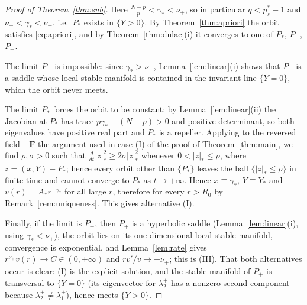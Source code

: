 \documentclass[11pt,reqno]{amsart}
\numberwithin{equation}{section}
\theoremstyle{plain}
\theoremstyle{definition}
\newcommand{\gs}{\gamma_{*}}
\begin{document}
\begin{proof}[Proof of Theorem~\ref{thm:sub}]
Here $\frac{N-p}{p}<\gs<\nu_{+}$, so in particular $q<p^{*}_{s}-1$ and
$\nu_{-}<\gs<\nu_{+}$, i.e.\ $P_{*}$ exists in $\{Y>0\}$. By
Theorem~\ref{thm:apriori} the orbit satisfies \eqref{eq:apriori}, and by
Theorem~\ref{thm:dulac}(i) it converges to one of $P_{*}$, $P_{-}$, $P_{+}$.

The limit $P_{-}$ is impossible: since $\gs>\nu_{-}$, Lemma~\ref{lem:linear}(i)
shows that $P_{-}$ is a saddle whose local stable manifold is contained in the
invariant line $\{Y=0\}$, which the orbit never meets.

The limit $P_{*}$ forces the orbit to be constant: by
Lemma~\ref{lem:linear}(ii) the Jacobian at $P_{*}$ has trace
$p\gs-(N-p)>0$ and positive determinant, so both eigenvalues have positive real
part and $P_{*}$ is a repeller. Applying to the reversed field $-\mathbf F$ the
argument used in case {\rm(I)} of the proof of Theorem~\ref{thm:main}, we find
$\rho,\sigma>0$ such that $\frac{d}{dt}|z|_{*}^{2}\ge2\sigma|z|_{*}^{2}$
whenever $0<|z|_{*}\le\rho$, where $z=(x,Y)-P_{*}$; hence every orbit other
than $\{P_{*}\}$ leaves the ball $\{|z|_{*}\le\rho\}$ in finite time and cannot
converge to $P_{*}$ as $t\to+\infty$. Hence $x\equiv\gs$, $Y\equiv Y_{*}$ and
$v(r)=A_{*}r^{-\gs}$ for all large $r$, therefore for every $r>R_{0}$ by
Remark~\ref{rem:uniqueness}. This gives alternative {\rm(I)}.

Finally, if the limit is $P_{+}$, then $P_{+}$ is a hyperbolic saddle
(Lemma~\ref{lem:linear}(i), using $\gs<\nu_{+}$), the orbit lies on its
one-dimensional local stable manifold, convergence is exponential, and
Lemma~\ref{lem:rate} gives $r^{\nu_{+}}v(r)\to C\in(0,+\infty)$ and
$rv'/v\to-\nu_{+}$; this is {\rm(III)}. That both alternatives occur is clear:
{\rm(I)} is the explicit solution, and the stable manifold of $P_{+}$ is
transversal to $\{Y=0\}$ (its eigenvector for $\lambda_{2}^{+}$ has a nonzero
second component because $\lambda_{2}^{+}\ne\lambda_{1}^{+}$), hence meets
$\{Y>0\}$.
\end{proof}
\end{document}
